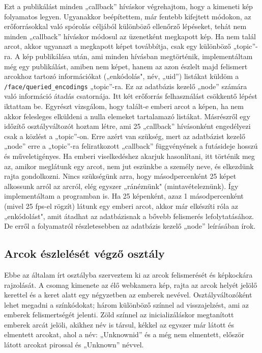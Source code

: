 Ezt a publikálást minden „callback” híváskor végrehajtom, hogy a kimeneti kép folyamatos legyen. Ugyanakkor beépítettem, már fentebb kifejtett módokon, az erőforrásokkal való spórolás céljából különböző ellenőrző lépéseket, tehát nem minden „callback” híváskor módosul az üzenetként megkapott kép. Ha nem talál arcot, akkor ugyanazt a megkapott képet továbbítja, csak egy különböző „topic”-ra. A kép publikálása után, ami minden hívásban megtörténik, implementáltam még egy publikálást, amiben nem képet, hanem az azon észlelt majd felismert arcokhoz tartozó információkat („enkódolás", név, „uid”) listákat küldöm a \verb|/face/queried_encodings| „topic”-ra. Ez az adatbázis kezelő „node” számára való információ átadás csatornája. Itt két erőforrás felhasználást csökkentő lépést iktattam be. Egyrészt vizsgálom, hogy talált-e emberi arcot a képen, ha nem akkor felesleges elküldeni a nulla elemeket tartalamazó listákat. Másrészről egy időzítő osztályváltozót hoztam létre, ami 25 „callback” hívásonként engedélyezi csak a közlést a „topic”-on. Erre azért van szükség, mert az adatbázist kezelő „node” erre a „topic”-ra feliratkozott „callback” függvényének a futásideje hosszú és műveletigényes. Ha emberi viselkedéshez akarjuk hasonlítani, itt történik meg az, amikor meglátunk egy arcot, nem jut eszünkbe a személy neve, és elkezdünk rajta gondolkozni. Nincs szükségünk arra, hogy másodpercenként 25 képet alkossunk arról az arcról, elég egyszer „ránéznünk" (mintavételeznünk). Így implementáltam a programban is. Ha 25 képenként, azaz 1 másodpercenként (mivel 25 fps-el rögzít) látunk egy emberi arcot, akkor már elkészíti róla az „enkódolást", amit átadhat az adatbázisnak a bővebb felismerés lefolytatásához. De erről a folyamatról részletesebben az adatbázis kezelő „node” leírásában írok.

\subsection{Arcok észlelését végző osztály}

Ebbe az általam írt osztályba szerveztem ki az arcok felismerését és képkockára rajzolását. A csomag kimenete az élő webkamera kép, rajta az arcok helyét jelölő kerettel és a keret alatt egy négyzetben az emberek nevével.
Osztályváltozóként lehet megadni a színkódokat; három különböző színnel ad visszajelzést, ami az emberek felismertségét jelenti. Zöld színnel az inicializáláskor megtanított emberek arcát jelöli, akikhez név is társul, kékkel az egyszer már látott és elmentett arcokat, ahol a név: „Unknown\textunderscore id” és a még nem elmentett, először látott arcokat pirossal és „Unknown” névvel.


